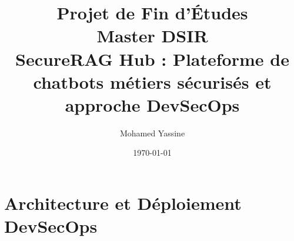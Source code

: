 \documentclass[12pt,a4paper]{report}
\begin{document}
\title{\textbf{Projet de Fin d'Études} \\ Master DSIR \\ \vspace{0.5cm} \Large SecureRAG Hub : Plateforme de chatbots métiers sécurisés et approche DevSecOps}
\author{Mohamed Yassine}
\date{\today}

\maketitle

\tableofcontents



\chapter{Architecture et Déploiement DevSecOps}










\end{document}
